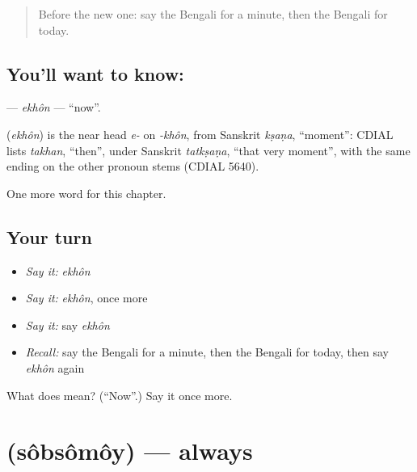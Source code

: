 \label{lesson:BN-C79-ekhon}



\begin{quote}
Before the new one: say the Bengali for a minute, then the Bengali for today.
\end{quote}

\subsection*{You'll want to know: }
\textbf{} — \emph{ekhôn} — \textquotedblleft{}now\textquotedblright{}.

\begin{cousinweb}
\textbf{} (\emph{ekhôn}) is the near head \emph{e-} on \emph{-khôn}, from Sanskrit \emph{kṣaṇa}, \textquotedblleft{}moment\textquotedblright{}: CDIAL lists \emph{takhan}, \textquotedblleft{}then\textquotedblright{}, under Sanskrit \emph{tatkṣaṇa}, \textquotedblleft{}that very moment\textquotedblright{}, with the same ending on the other pronoun stems (CDIAL 5640).
\end{cousinweb}

\begin{grammarlens}[title={What you've built}]
One more word for this chapter.
\end{grammarlens}

\subsection*{Your turn}
\begin{itemize}
\raggedright
  \item \emph{Say it:} \emph{ekhôn}
  \item \emph{Say it:} \emph{ekhôn}, once more
  \item \emph{Say it:} say \emph{ekhôn}
  \item \emph{Recall:} say the Bengali for a minute, then the Bengali for today, then say \emph{ekhôn} again
\end{itemize}

\begin{tcolorbox}[breakable,colback=teal!4,colframe=teal!35!black,title={Before you move on}]
What does  mean? (\textquotedblleft{}Now\textquotedblright{}.) Say it once more.
\end{tcolorbox}
\section[\texorpdfstring{\bn{সবসময়} (sôbsômôy)}{সবসময় (sôbsômôy)}]{ (sôbsômôy) — always}

